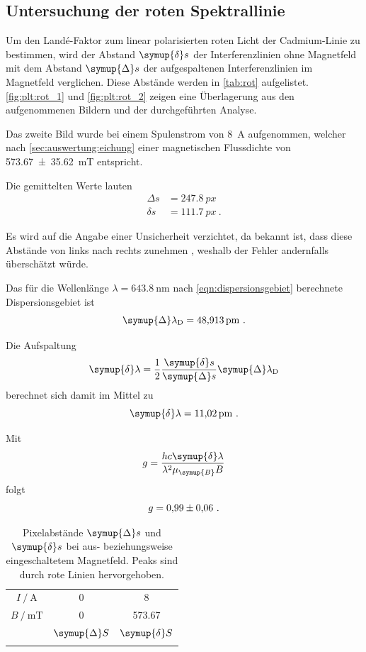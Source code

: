 \subsection{Untersuchung der roten Spektrallinie}
Um den Landé-Faktor zum linear polarisierten roten Licht der Cadmium-Linie zu bestimmen,
wird der Abstand $\symup{\delta} s$ der Interferenzlinien ohne Magnetfeld
mit dem Abstand $\symup{\Delta} s$ der aufgespaltenen Interferenzlinien im Magnetfeld verglichen.
Diese Abstände werden in \autoref{tab:rot} aufgelistet.
\autoref{fig:plt:rot_1} und \autoref{fig:plt:rot_2} zeigen eine Überlagerung
aus den aufgenommenen Bildern und der durchgeführten Analyse.

Das zweite Bild wurde bei einem Spulenstrom von \SI{8}{\ampere} aufgenommen,
welcher nach \autoref{sec:auswertung:eichung} einer magnetischen Flussdichte von \SI{573.67 \pm 35.62}{\milli\tesla} entspricht.

Die gemittelten Werte lauten
\begin{align*}
    Δs &= \SI{247.8}{px} \\
    δs &= \SI{111.7}{px} \ .
\end{align*}

Es wird auf die Angabe einer Unsicherheit verzichtet,
da bekannt ist, dass diese Abstände von links nach rechts zunehmen \cite{versuchsanleitung},
weshalb der Fehler andernfalls überschätzt würde.


Das für die Wellenlänge $\lambda = \SI{643.8}{\nano\meter}$ nach \autoref{eqn:dispersionsgebiet} berechnete Dispersionsgebiet ist
\[
    \symup{\Delta}\lambda_\text{D} = \SI{48.913}{\pico\meter} \ .
\]

Die Aufspaltung
\begin{equation}
    \label{eqn:delta_lambda}
    \symup{\delta} \lambda = \frac{1}{2} \frac{\symup{\delta} s}{\symup{\Delta} s} \symup{\Delta} \lambda_\text{D}
\end{equation}
berechnet sich damit im Mittel zu
\[
    \symup{\delta} \lambda = \SI{11.02}{\pico\meter} \ .
\]

Mit
\begin{equation}
    \label{eqn:g_mess}
    g = \frac{hc \symup{\delta} \lambda}{\lambda^2 \mu_{\symup{B}} B}
\end{equation}
folgt
\[
    g = \num{0.99 \pm 0.06} \ .
\]


\begin{table}[H]
    \centering
    \caption{
        Pixelabstände $\symup{\Delta} s$ und $\symup{\delta} s$ bei aus- beziehungsweise eingeschaltetem Magnetfeld.
        Peaks sind durch rote Linien hervorgehoben.
    }
    \label{tab:rot}
    \begin{tabular}{S S S}
        \toprule
        {$I \mathbin{/} \si{\ampere}$} & 0 & 8 \\
        {$B \mathbin{/} \si{\milli\tesla}$} & 0 & 573.67  \\
        \midrule
        & {$\symup{\Delta} S$} & {$\symup{\delta} S$} \\
        \midrule
        \bottomrule
    \end{tabular}
\end{table}

